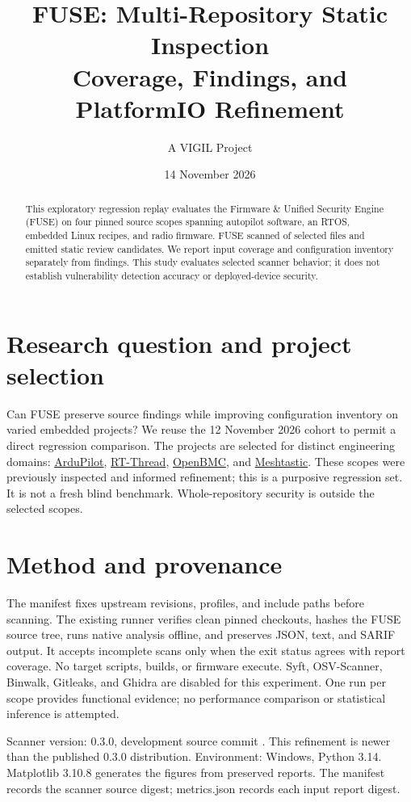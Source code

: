 \documentclass[11pt,a4paper]{article}
\title{FUSE: Multi-Repository Static Inspection\\\large Coverage, Findings, and PlatformIO Refinement}
\author{A VIGIL Project}
\date{14 November 2026}
\begin{document}
\maketitle
\begin{abstract}
This exploratory regression replay evaluates the Firmware \& Unified Security Engine (FUSE) on four pinned source scopes spanning autopilot software, an RTOS, embedded Linux recipes, and radio firmware. FUSE scanned \ScannedFiles{} of \SelectedFiles{} selected files and emitted \RawFindings{} static review candidates. We report input coverage and configuration inventory separately from findings. This study evaluates selected scanner behavior; it does not establish vulnerability detection accuracy or deployed-device security.
\end{abstract}
\section{Research question and project selection}
Can FUSE preserve source findings while improving configuration inventory on varied embedded projects? We reuse the 12 November 2026 cohort to permit a direct regression comparison. The projects are selected for distinct engineering domains: \href{https://github.com/ArduPilot/ardupilot}{ArduPilot}, \href{https://github.com/RT-Thread/rt-thread}{RT-Thread}, \href{https://github.com/openbmc/openbmc}{OpenBMC}, and \href{https://github.com/meshtastic/firmware}{Meshtastic}. These scopes were previously inspected and informed refinement; this is a purposive regression set. It is not a fresh blind benchmark. Whole-repository security is outside the selected scopes.
\section{Method and provenance}
The manifest fixes upstream revisions, profiles, and include paths before scanning. The existing runner verifies clean pinned checkouts, hashes the FUSE source tree, runs native analysis offline, and preserves JSON, text, and SARIF output. It accepts incomplete scans only when the exit status agrees with report coverage. No target scripts, builds, or firmware execute. Syft, OSV-Scanner, Binwalk, Gitleaks, and Ghidra are disabled for this experiment. One run per scope provides functional evidence; no performance comparison or statistical inference is attempted.

Scanner version: 0.3.0, development source commit \texttt{\ScannerCommit}. This refinement is newer than the published 0.3.0 distribution. Environment: Windows, Python 3.14. Matplotlib 3.10.8 generates the figures from preserved reports. The manifest records the scanner source digest; metrics.json records each input report digest.
\begin{itemize}\PinnedScopes\end{itemize}
\end{document}
